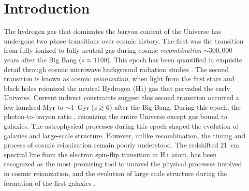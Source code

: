 \documentclass[
reprint,
superscriptaddress,
amsmath,
amssymb,
aps,
prd
]{revtex4-1}
\newcommand{\HI}{H\,{\sc i}}
\begin{document}
\pacs{}%


\maketitle


\section{Introduction}\label{sec:intro}

The hydrogen gas that dominates the baryon content of the Universe has undergone two phase transitions over cosmic history. The first was the transition from fully ionized to fully neutral gas during cosmic \emph{recombination\/} $\sim 300,000$ years after the Big Bang ($z\approx 1100$). This epoch has been quantified in exquisite detail through cosmic microwave background radiation studies \cite{planck15i}. The second transition is known as cosmic \emph{reionization}, when light from the first stars and black holes reionized the neutral Hydrogen (\HI) gas that pervaded the early Universe. Current indirect constraints suggest this second transition occurred a few hundred Myr to $\sim 1$~Gyr ($z\gtrsim 6$) \cite{gre17a} after the Big Bang. During this epoch, the photon-to-baryon ratio , reionizing the entire Universe except gas bound to galaxies. The astrophysical processes during this epoch shaped the evolution of galaxies and large-scale structure. However, unlike recombination, the timing and process of cosmic reionization remain poorly understood. The redshifted 21~cm spectral line from the electron spin-flip transition in \HI\ atom, has been recognized as the most promising tool to unravel the physical processes involved in cosmic reionization, and the evolution of large scale structure during the formation of the first galaxies \cite{sun72,sco90,mad97,toz00,ili02,fan02,fan06,bar07,mor10}.
\end{document}
